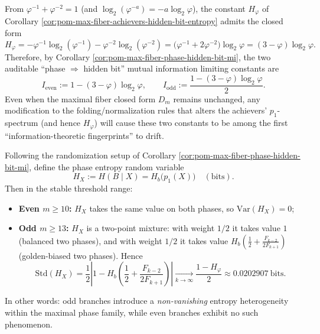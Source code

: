 \begin{remark}\label{rem:pom-max-fiber-hidden-bit-leakage-constants}
From \(\varphi^{-1}+\varphi^{-2}=1\) (and \(\log_2(\varphi^{-a})=-a\log_2\varphi\)), the constant \(H_\varphi\) of Corollary \ref{cor:pom-max-fiber-achievers-hidden-bit-entropy} admits the closed form
\[
H_\varphi
=-\varphi^{-1}\log_2(\varphi^{-1})-\varphi^{-2}\log_2(\varphi^{-2})
=\bigl(\varphi^{-1}+2\varphi^{-2}\bigr)\log_2\varphi
=(3-\varphi)\log_2\varphi.
\]
Therefore, by Corollary \ref{cor:pom-max-fiber-phase-hidden-bit-mi}, the two auditable ``phase \(\Rightarrow\) hidden bit'' mutual information limiting constants are
\[
I_{\mathrm{even}}
:=1-(3-\varphi)\log_2\varphi,
\qquad
I_{\mathrm{odd}}
:=\frac{1-(3-\varphi)\log_2\varphi}{2}.
\]
Even when the maximal fiber closed form \(D_m\) remains unchanged, any modification to the folding/normalization rules that alters the achievers' \(p_1\)-spectrum (and hence \(H_\varphi\)) will cause these two constants to be among the first ``information-theoretic fingerprints'' to drift.
\end{remark}

\begin{corollary}\label{cor:pom-max-fiber-phase-hidden-bit-entropy-spread}
Following the randomization setup of Corollary \ref{cor:pom-max-fiber-phase-hidden-bit-mi}, define the phase entropy random variable
\[
H_X:=H(B\mid X)=H_b\!\bigl(p_1(X)\bigr)\quad(\text{bits}).
\]
Then in the stable threshold range:
\begin{itemize}
  \item \textbf{Even \(m\ge 10\):} \(H_X\) takes the same value on both phases, so \(\mathrm{Var}(H_X)=0\);
  \item \textbf{Odd \(m\ge 13\):} \(H_X\) is a two-point mixture: with weight \(1/2\) it takes value \(1\) (balanced two phases), and with weight \(1/2\) it takes value \(H_b(\tfrac12+\tfrac{F_{k-2}}{2F_{k+1}})\) (golden-biased two phases).
  Hence
  \[
  \mathrm{Std}(H_X)
  =\frac12\left|1-H_b\!\left(\frac12+\frac{F_{k-2}}{2F_{k+1}}\right)\right|
  \xrightarrow[k\to\infty]{}
  \frac{1-H_\varphi}{2}
  \approx 0.0202907\ \mathrm{bits}.
  \]
\end{itemize}
In other words: odd branches introduce a \emph{non-vanishing} entropy heterogeneity within the maximal phase family, while even branches exhibit no such phenomenon.
\end{corollary}

